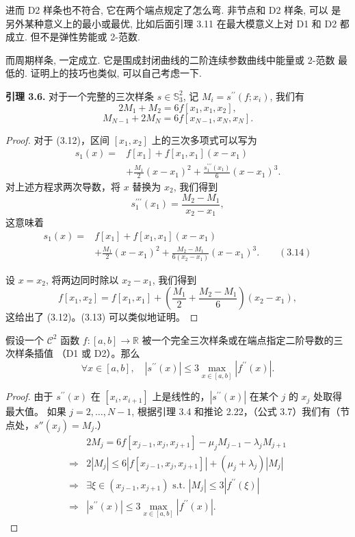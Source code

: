 \documentclass[a4paper]{ctexart}
\begin{document}
{进而 D2 样条也不符合, 它在两个端点规定了怎么弯. 非节点和 D2 样条, 可以
是另外某种意义上的最小或最优, 比如后面引理 3.11 在最大模意义上对 D1 和
D2 都成立. 但不是弹性势能或 2-范数.

而周期样条, 一定成立. 它是围成封闭曲线的二阶连续参数曲线中能量或 2-范数
最低的. 证明上的技巧也类似, 可以自己考虑一下.

\noindent \textbf{引理 3.6.} 对于一个完整的三次样条 $s\in \mathbb{S}_{3}^{2}$, 记 $M_{i}=s^{\prime\prime}\left(f; x_{i}\right)$, 
我们有
\[
2 M_{1} + M_{2} = 6 f\left[x_{1}, x_{1}, x_{2}\right], \tag{3.12}
\]
\[
M_{N - 1} + 2 M_N = 6 f\left[x_{N - 1}, x_N, x_N\right].\tag{3.13}
\]

\begin{proof}
对于 (3.12)，区间 $\left[x_{1}, x_{2}\right]$ 上的三次多项式可以写为
\begin{align*}
s_1(x) = & f\left[x_1\right] + f\left[x_1, x_1\right]\left(x - x_1\right)\\
& + \frac{M_1}{2}\left(x - x_1\right)^2 + \frac{s_1^{\prime\prime\prime}\left(x_1\right)}{6}\left(x - x_1\right)^3.
\end{align*}
对上述方程求两次导数，将 $x$ 替换为 $x_{2}$, 我们得到 
$$
s_{1}^{\prime\prime\prime}\left(x_{1}\right) = \frac{M_{2} - M_{1}}{x_{2} - x_{1}},
$$
这意味着
\begin{align*}
s_1(x)=& f\left[x_1\right]+f\left[x_1, x_1\right]\left(x-x_1\right)\\
&+\frac{M_1}{2}\left(x-x_1\right)^2+\frac{M_2-M_1}{6\left(x_2-x_1\right)}\left(x-x_1\right)^3. \qquad(3.14)
\end{align*}

设 $x = x_{2}$, 将两边同时除以 $x_{2} - x_{1}$, 我们得到
\[
f\left[x_{1}, x_{2}\right]=f\left[x_{1}, x_{1}\right]+\left(\frac{M_{1}}{2}+\frac{M_{2}-M_{1}}{6}\right)\left(x_{2}-x_{1}\right),
\]
这给出了 (3.12)。(3.13) 可以类似地证明。
\end{proof}

 假设一个 \(\mathcal{C}^{2}\) 函数 \(f:[a, b]\rightarrow \mathbb{R}\) 
被一个完全三次样条或在端点指定二阶导数的三次样条插值 （D1 或 D2）。那么
\[ 
\forall x \in [a, b], \quad \left|s^{\prime\prime}(x)\right| \leq 3 \max_{x \in [a, b]} \left|f^{\prime\prime}(x)\right|. \tag{3.18} 
\]

\begin{proof} 由于 \(s^{\prime\prime}(x)\) 在 \([x_i, x_{i+1}]\) 上是线性的，\(\left|s^{\prime\prime}(x)\right|\) 在某个 \(j\) 的 \(x_j\) 处取得最大值。
  如果 \(j = 2, \ldots, N-1\), 根据引理 3.4 和推论 2.22，（公式 3.7）我们有（节点处，$s''(x_j) = M_j$.）
\begin{align*}
& 2 M_j = 6 f[x_{j-1}, x_j, x_{j+1}] - \mu_j M_{j-1} - \lambda_j M_{j+1} \\
\Rightarrow & 2 \left|M_j\right| \leq 6 \left|f[x_{j-1}, x_j, x_{j+1}]\right| + (\mu_j + \lambda_j) \left|M_j\right| \\
\Rightarrow & \exists \xi \in (x_{j-1}, x_{j+1}) \text{ s.t. } \left|M_j\right| \leq 3 \left|f^{\prime\prime}(\xi)\right| \\
\Rightarrow & \left|s^{\prime\prime}(x)\right| \leq 3 \max_{x \in [a, b]} \left|f^{\prime\prime}(x)\right|.
\end{align*} 


\end{proof}}
\end{document}
